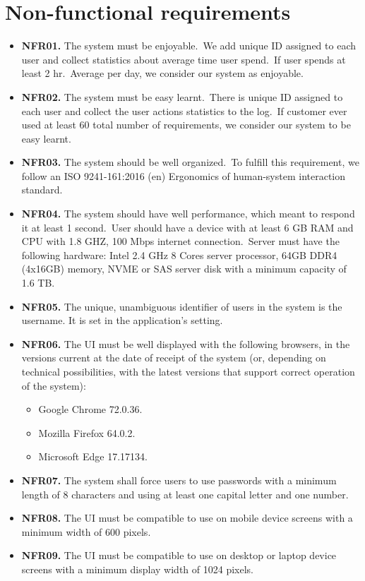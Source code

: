 \section{Non-functional requirements}\label{sec:non-functional-requirements}
\begin{itemize}
    \item \textbf{NFR01.} The system must be enjoyable.\ We add unique ID assigned to each user and
    collect statistics about average time user spend.\ If user spends at least 2 hr.\ Average
    per day, we consider our system as enjoyable.
    \item \textbf{NFR02.} The system must be easy learnt.\ There is unique ID assigned to each user and
    collect the user actions statistics to the log.\ If customer ever used at least 60%
    total number of requirements, we consider our system to be easy learnt.
    \item \textbf{NFR03.} The system should be well organized.\ To fulfill this requirement, we follow an
    ISO 9241-161:2016 (en) Ergonomics of human-system interaction standard.
    \item \textbf{NFR04.} The system should have well performance, which meant to respond it at
    least 1 second.\ User should have a device with at least 6 GB RAM and CPU with 1.8
    GHZ, 100 Mbps internet connection.\ Server must have the following hardware: Intel
    2.4 GHz 8 Cores server processor, 64GB DDR4 (4x16GB) memory, NVME or SAS
    server disk with a minimum capacity of 1.6 TB.
    \item \textbf{NFR05.} The unique, unambiguous identifier of users in the system is the username. It
    is set in the application’s setting.
    \item \textbf{NFR06.} The UI must be well displayed with the following browsers, in the versions
    current at the date of receipt of the system (or, depending on technical possibilities,
    with the latest versions that support correct operation of the system):
    \begin{itemize}
        \item Google Chrome 72.0.36.
        \item Mozilla Firefox 64.0.2.
        \item Microsoft Edge 17.17134.
    \end{itemize}
    \item \textbf{NFR07.} The system shall force users to use passwords with a minimum length of 8
    characters and using at least one capital letter and one number.
    \item \textbf{NFR08.} The UI must be compatible to use on mobile device screens with a minimum
    width of 600 pixels.
    \item \textbf{NFR09.} The UI must be compatible to use on desktop or laptop device screens with a
    minimum display width of 1024 pixels.
\end{itemize}